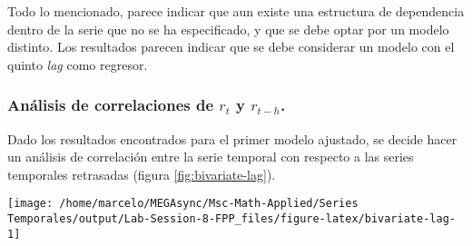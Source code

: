 \documentclass[]{article}
\newenvironment{Shaded}{\begin{snugshade}}{\end{snugshade}}
\newcommand{\DataTypeTok}[1]{\textcolor[rgb]{0.13,0.29,0.53}{#1}}
\newcommand{\DecValTok}[1]{\textcolor[rgb]{0.00,0.00,0.81}{#1}}
\newcommand{\KeywordTok}[1]{\textcolor[rgb]{0.13,0.29,0.53}{\textbf{#1}}}
\newcommand{\NormalTok}[1]{#1}
\newcommand{\OperatorTok}[1]{\textcolor[rgb]{0.81,0.36,0.00}{\textbf{#1}}}
\newcommand{\StringTok}[1]{\textcolor[rgb]{0.31,0.60,0.02}{#1}}
\begin{document}
Todo lo mencionado, parece indicar que aun existe una estructura de dependencia dentro de la serie que no se ha especificado, y que se debe optar por un modelo distinto. Los resultados parecen indicar que se debe considerar un modelo con el quinto \emph{lag} como regresor.

\hypertarget{anuxe1lisis-de-correlaciones-de-r_t-y-r_t-h.}{%
\subsubsection{\texorpdfstring{Análisis de correlaciones de \(r_t\) y \(r_{t-h}\).}{Análisis de correlaciones de r\_t y r\_\{t-h\}.}}\label{anuxe1lisis-de-correlaciones-de-r_t-y-r_t-h.}}

Dado los resultados encontrados para el primer modelo ajustado, se decide hacer un análisis de correlación entre la serie temporal con respecto a las series temporales retrasadas (figura \ref{fig:bivariate-lag}).

\begin{Shaded}
\end{Shaded}

\begin{center}\texttt{[image: /home/marcelo/MEGAsync/Msc-Math-Applied/Series Temporales/output/Lab-Session-8-FPP\_files/figure-latex/bivariate-lag-1]} \end{center}
\end{document}
